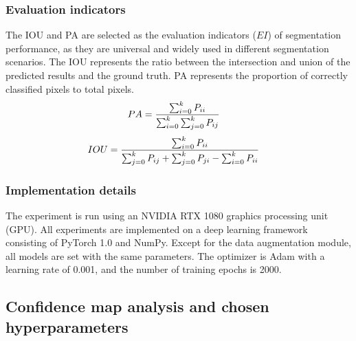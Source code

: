 \documentclass[sn-mathphys]{sn-jnl}%
\theoremstyle{thmstyleone}%
\theoremstyle{thmstyletwo}%
\theoremstyle{thmstylethree}%
\begin{document}
\subsubsection{Evaluation indicators}\label{sec:exp.1.2}
The IOU and PA are selected as the evaluation indicators ($EI$) of segmentation performance, as they are universal and widely used in different segmentation scenarios.
The IOU represents the ratio between the intersection and union of the predicted results and the ground truth.
PA represents the proportion of correctly classified pixels to total pixels.
\begin{equation}
\centering
\setlength{\abovedisplayskip}{3pt}
\setlength{\belowdisplayskip}{3pt}
\begin{split}
PA &= \frac{\sum_{i=0}^{k}P_{ii}}{\sum_{i=0}^{k}\sum_{j=0}^{k}P_{ij}}
\label{eq:3.3.8}
\end{split}
\end{equation}
\begin{equation}
\centering
\setlength{\abovedisplayskip}{3pt}
\setlength{\belowdisplayskip}{3pt}
\begin{split}
IOU &= \frac{\sum_{i=0}^{k}P_{ii}}{\sum_{j=0}^{k}P_{ij}+\sum_{j=0}^{k}P_{ji} - \sum_{i=0}^{k}P_{ii}}
\label{eq:3.3.8}
\end{split}
\end{equation}
\subsubsection{Implementation details}\label{sec:exp.1.2}
The experiment is run using an NVIDIA RTX 1080 graphics processing unit (GPU). All experiments are implemented on a deep learning framework consisting of PyTorch 1.0 and NumPy.
Except for the data augmentation module, all models are set with the same parameters. The optimizer is Adam \cite{kingma2014adam} with a learning rate of 0.001, and the number of training epochs is 2000.

\subsection{Confidence map analysis and chosen hyperparameters}\label{sec:exp.3}
\end{document}
